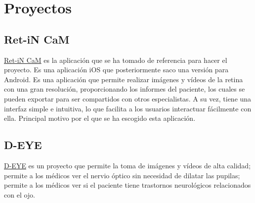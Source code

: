
\section{Proyectos}
    \subsection{Ret-iN CaM}
    \href{https://apps.apple.com/us/app/ret-in-cam/id1509765945}{Ret-iN CaM} es la aplicación que se ha tomado de referencia para hacer el proyecto. Es una aplicación iOS que posteriormente saco una versión para Android. Es una aplicación que permite realizar imágenes y vídeos de la retina con una gran resolución, proporcionando los informes del paciente, los cuales se pueden exportar para ser compartidos con otros especialistas.
    A su vez, tiene una interfaz simple e intuitiva, lo que facilita a los usuarios interactuar fácilmente con ella. Principal motivo por el que se ha escogido esta aplicación.

    \subsection{D-EYE}
    \href{https://www.d-eyecare.com/}{D-EYE} es un proyecto que permite la toma de imágenes y vídeos de alta calidad; permite a los médicos ver el nervio óptico sin necesidad de dilatar las pupilas; permite a los médicos ver si el paciente tiene trastornos neurológicos relacionados con el ojo.

\newpage

